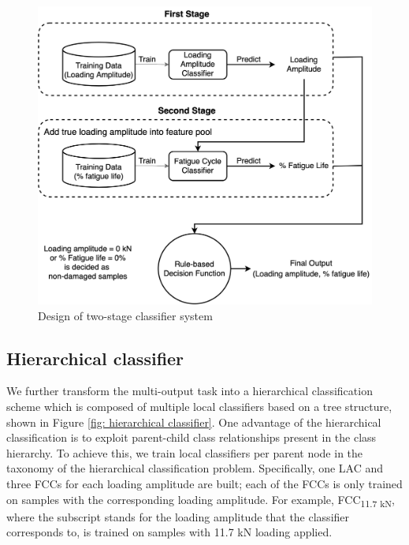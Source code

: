 \begin{figure}[tb]
    \centering
    \includegraphics[width=0.9\linewidth]{fig/two-stage_classifier.png}
    \caption{Design of two-stage classifier system}
    \label{fig: two-stage classifier}
\end{figure}

\subsection{Hierarchical classifier}
We further transform the multi-output task into a hierarchical classification scheme which is composed of multiple local classifiers based on a tree structure, shown in Figure \ref{fig: hierarchical classifier}. One advantage of the hierarchical classification is to exploit parent-child class relationships present in the class hierarchy. To achieve this, we train local classifiers per parent node in the taxonomy of the hierarchical classification problem. Specifically, one LAC and three FCCs for each loading amplitude are built; each of the FCCs is only trained on samples with the corresponding loading amplitude. For example, FCC\textsubscript{11.7 kN}, where the subscript stands for the loading amplitude that the classifier corresponds to, is trained on samples with 11.7 kN loading applied. 

